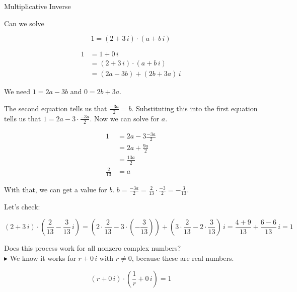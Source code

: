 \documentclass{ximera}
\begin{document}
\begin{example} Multiplicative Inverse


Can we solve

\[   1 = (2 + 3 \, i) \cdot (a + b \, i)       \]



\begin{align*}
1     & = 1 + 0 \, i  \\
      & =    (2 + 3 \, i) \cdot (a + b \, i)   \\
      & =    (2a - 3b) + (2b+3a) \, i   
\end{align*}


We need $1 = 2a - 3b$ and $0 = 2b+3a$.


The second  equation tells us that $\frac{-3a}{2} = b$.  Substituting this into the first equation tells us that $1 = 2a - 3 \cdot \frac{-3a}{2}$.  Now we can solve for $a$.



\begin{align*}
1     & = 2a - 3\frac{-3a}{2}  \\
      & =   2a + \frac{9a}{2}   \\
      & =    \frac{13a}{2}   \\
  \frac{2}{13}    & =  a
\end{align*}




With that, we can get a value for $b$.   $ b = \frac{-3a}{2} = \frac{2}{13}  \cdot \frac{-3}{2} = -\frac{3}{13}$.

Let's check:



\[    (2 + 3 \, i) \cdot (\frac{2}{13} - \frac{3}{13} \, i)     =   \left( 2 \cdot  \frac{2}{13} - 3 \cdot \left(- \frac{3}{13}\right)\right)  + \left( 3 \cdot \frac{2}{13} - 2 \cdot \frac{3}{13} \right) \, i = \frac{4+9}{13} + \frac{6-6}{13} \, i = 1  \]







\end{example}


Does this process work for all nonzero complex numbers? \\


$\blacktriangleright$  We know it works for $r + 0 \, i$ with $r \ne 0$, because these are real numbers.


\[   (r + 0 \, i) \cdot \left(\frac{1}{r} + 0 \, i \right) = 1        \]
\end{document}
